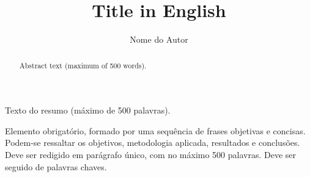 \documentclass[openright]{abnt-UTFPR-PPGCA-proj} %
\title{Title in English} %
\author{Nome do Autor}
\begin{document}
\sloppy

\capa %




\begin{resumo}
Texto do resumo (m\'aximo de 500 palavras).

Elemento obrigatório, formado por uma sequência de frases objetivas e concisas. Podem-se ressaltar os objetivos, metodologia aplicada, resultados e conclusões. Deve ser redigido em parágrafo único, com no máximo 500 palavras. Deve ser seguido de palavras chaves.
\end{resumo}

\begin{abstract}
Abstract text (maximum of 500 words).
\end{abstract}

\listadefiguras %
\listadetabelas %
\listadesiglas %
\listadesimbolos %

\sumario %












\end{document}
